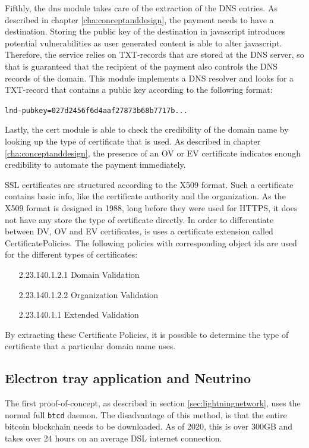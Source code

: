 Fifthly, the dns module takes care of the extraction of the DNS entries. As described in chapter \ref{cha:conceptanddesign}, the payment needs to have a destination. Storing the public key of the destination in javascript introduces potential vulnerabilities as user generated content is able to alter javascript. Therefore, the service relies on TXT-records that are stored at the DNS server, so that is guaranteed that the recipient of the payment also controls the DNS records of the domain. This module implements a DNS resolver and looks for a TXT-record that contains a public key according to the following format:

\texttt{lnd-pubkey=027d2456f6d4aaf27873b68b7717b...}

Lastly, the cert module is able to check the credibility of the domain name by looking up the type of certificate that is used. As described in chapter \ref{cha:conceptanddesign}, the presence of an OV or EV certificate indicates enough credibility to automate the payment immediately. 

SSL certificates are structured according to the X509 format. Such a certificate contains basic info, like the certificate authority and the organization. As the X509 format is designed in 1988, long before they were used for HTTPS, it does not have any store the type of certificate directly. In order to differentiate between DV, OV and EV certificates, is uses a certificate extension called CertificatePolicies. The following policies with corresponding object ids are used for the different types of certificates:

\begin{enumerate}[leftmargin=8em]
  \item[2.23.140.1.2.1] Domain Validation
  \item[2.23.140.1.2.2] Organization Validation
  \item[2.23.140.1.1] Extended Validation
\end{enumerate}

By extracting these Certificate Policies, it is possible to determine the type of certificate that a particular domain name uses. 

\subsection{Electron tray application and Neutrino}
The first proof-of-concept, as described in section \ref{sec:lightningnetwork}, uses the normal full \texttt{btcd} daemon. The disadvantage of this method, is that the entire bitcoin blockchain needs to be downloaded. As of 2020, this is over 300GB and takes over 24 hours on an average DSL internet connection. 

